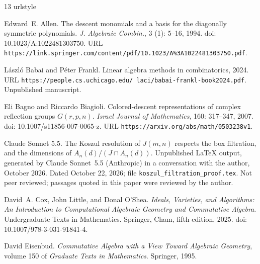 \documentclass[12pt]{amsart}
\theoremstyle{definition}
\theoremstyle{remark}
\begin{document}
\begin{thebibliography}{13}
\providecommand{\natexlab}[1]{#1}
\providecommand{\url}[1]{\texttt{#1}}
\expandafter\ifx\csname urlstyle\endcsname\relax
  \providecommand{\doi}[1]{doi: #1}\else
  \providecommand{\doi}{doi: \begingroup \urlstyle{rm}\Url}\fi

Edward~E. Allen.
\newblock The descent monomials and a basis for the diagonally symmetric
  polynomials.
\newblock \emph{J. Algebraic Combin.}, 3 (1): 5--16, 1994.
\newblock \doi{10.1023/A:1022481303750}.
\newblock URL
  \url{https://link.springer.com/content/pdf/10.1023/A\%3A1022481303750.pdf}.

L{\'a}szl{\'o} Babai and P{\'e}ter Frankl.
\newblock Linear algebra methods in combinatorics, 2024.
\newblock URL
  \url{https://people.cs.uchicago.edu/~laci/babai-frankl-book2024.pdf}.
\newblock Unpublished manuscript.

Eli Bagno and Riccardo Biagioli.
\newblock Colored-descent representations of complex reflection groups
  {$G(r,p,n)$}.
\newblock \emph{Israel Journal of Mathematics}, 160: 317--347, 2007.
\newblock \doi{10.1007/s11856-007-0065-z}.
\newblock URL \url{https://arxiv.org/abs/math/0503238v1}.

{Claude Sonnet 5.5}.
\newblock The {K}oszul resolution of {$J(m,n)$} respects the box filtration,
  and the dimensions of {$A_n(d)/(J\cap A_n(d))$}.
\newblock Unpublished {\LaTeX} output, generated by Claude Sonnet~5.5
  (Anthropic) in a conversation with the author, October 2026.
\newblock Dated October 22, 2026; file \texttt{koszul\_filtration\_proof.tex}.
  Not peer reviewed; passages quoted in this paper were reviewed by the author.

David~A. Cox, John Little, and Donal O'Shea.
\newblock \emph{Ideals, Varieties, and Algorithms: An Introduction to
  Computational Algebraic Geometry and Commutative Algebra}.
\newblock Undergraduate Texts in Mathematics. Springer, Cham, fifth edition,
  2025.
\newblock \doi{10.1007/978-3-031-91841-4}.

David Eisenbud.
\newblock \emph{Commutative Algebra with a View Toward Algebraic Geometry},
  volume 150 of \emph{Graduate Texts in Mathematics}.
\newblock Springer, 1995.


\end{thebibliography}
\end{document}
